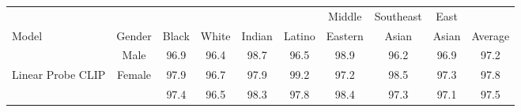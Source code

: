 \documentclass{article}
\begin{document}
\begin{table*}[t]
\vskip 0.15in
\begin{center}
\begin{tabular}{lccccccccc}
\toprule
      &        &       &       &        &        & \hspace{-0.3em}Middle\hspace{-0.3em}  & \hspace{-0.3em}\hspace{-0.3em}Southeast\hspace{-0.3em}\hspace{-0.3em} & \hspace{-0.3em}East\hspace{-0.3em}  &         \\
\hspace{-0.3em}Model & \hspace{-0.3em}Gender\hspace{-0.3em} & \hspace{-0.3em}Black\hspace{-0.3em} & \hspace{-0.3em}White\hspace{-0.3em} & \hspace{-0.3em}Indian\hspace{-0.3em} & \hspace{-0.3em}Latino\hspace{-0.3em} & \hspace{-0.3em}Eastern\hspace{-0.3em} & \hspace{-0.3em}Asian\hspace{-0.3em}     & \hspace{-0.3em}Asian\hspace{-0.3em} & \hspace{-0.3em}\hspace{-0.3em}Average\hspace{-0.3em}\hspace{-0.3em} \\ \midrule
& \hspace{-0.3em}Male\hspace{-0.3em}& 96.9& 96.4& 98.7& 96.5&98.9& 96.2& 96.9& 97.2 \\
\hspace{-0.3em}Linear Probe CLIP &
\hspace{-0.3em}Female\hspace{-0.3em}& 97.9& 96.7& 97.9& 99.2& 97.2& 98.5& 97.3& 97.8\\
 & & 97.4& 96.5& 98.3& 97.8& 98.4& 97.3& 97.1& 97.5 \\

\end{tabular}
\end{center}
\end{table*}
\end{document}

